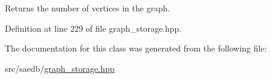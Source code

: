 Returns the number of vertices in the graph. 



Definition at line 229 of file graph\-\_\-storage.\-hpp.



The documentation for this class was generated from the following file\-:\begin{DoxyCompactItemize}
\item 
src/saedb/\hyperlink{graph__storage_8hpp}{graph\-\_\-storage.\-hpp}\end{DoxyCompactItemize}
